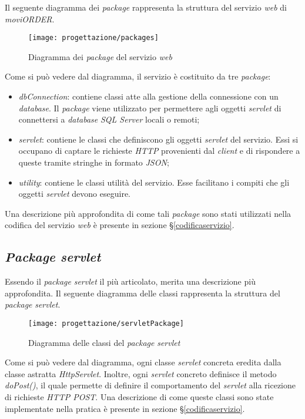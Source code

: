 Il seguente diagramma dei \textit{package} rappresenta la struttura del servizio \textit{web} di \textit{moviORDER}.

\begin{figure}[!h] 
    \centering 
    \texttt{[image: progettazione/packages]} 
    \caption{Diagramma dei \textit{package} del servizio \textit{web}}
\end{figure}

Come si può vedere dal diagramma, il servizio è costituito da tre \textit{package}:
\begin{itemize}
	\item \textit{dbConnection}: contiene classi atte alla gestione della connessione con un \textit{database}. Il \textit{package} viene utilizzato per permettere agli oggetti \textit{servlet} di connettersi a \textit{database} \textit{SQL Server} locali o remoti;
	\item \textit{servlet}: contiene le classi che definiscono gli oggetti \textit{servlet} del servizio. Essi si occupano di captare le richieste \textit{HTTP} provenienti dal \textit{client} e di rispondere a queste tramite stringhe in formato \textit{JSON};
	\item \textit{utility}: contiene le classi utilità del servizio. Esse facilitano i compiti che gli oggetti \textit{servlet} devono eseguire.
\end{itemize}
Una descrizione più approfondita di come tali \textit{package} sono stati utilizzati nella codifica del servizio \textit{web} è presente in sezione §\ref{codificaservizio}.

\subsection{\textit{Package servlet}}

Essendo il \textit{package} \textit{servlet} il più articolato, merita una descrizione più approfondita. Il seguente diagramma delle classi rappresenta la struttura del \textit{package} \textit{servlet}.

\begin{figure}[!h] 
    \centering 
    \texttt{[image: progettazione/servletPackage]} 
    \caption{Diagramma delle classi del \textit{package} \textit{servlet}}
\end{figure}

Come si può vedere dal diagramma, ogni classe \textit{servlet} concreta eredita dalla classe astratta \textit{HttpServlet}. Inoltre, ogni \textit{servlet} concreto definisce il metodo \textit{doPost()}, il quale permette di definire il comportamento del \textit{servlet} alla ricezione di richieste \textit{HTTP POST}. Una descrizione di come queste classi sono state implementate nella pratica è presente in sezione §\ref{codificaservizio}.

